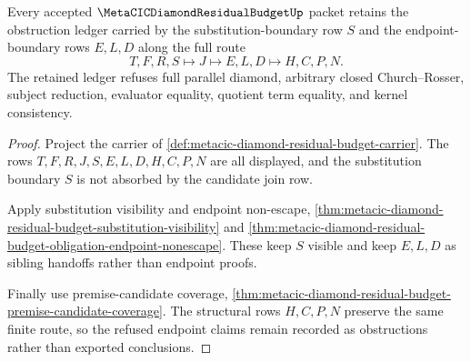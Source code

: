 \begin{theorem}
\label{thm:metacic-diamond-residual-budget-obstruction-ledger}
Every accepted $\MetaCICDiamondResidualBudgetUp$ packet retains the obstruction ledger carried by the substitution-boundary row $S$ and the endpoint-boundary rows $E,L,D$ along the full route
$$
T,F,R,S \longmapsto J \longmapsto E,L,D \longmapsto H,C,P,N .
$$
The retained ledger refuses full parallel diamond, arbitrary closed Church--Rosser, subject reduction, evaluator equality, quotient term equality, and kernel consistency.
\end{theorem}
\begin{proof}
Project the carrier of \autoref{def:metacic-diamond-residual-budget-carrier}. The rows $T,F,R,J,S,E,L,D,H,C,P,N$ are all displayed, and the substitution boundary $S$ is not absorbed by the candidate join row.

Apply substitution visibility and endpoint non-escape, \autoref{thm:metacic-diamond-residual-budget-substitution-visibility} and \autoref{thm:metacic-diamond-residual-budget-obligation-endpoint-nonescape}. These keep $S$ visible and keep $E,L,D$ as sibling handoffs rather than endpoint proofs.

Finally use premise-candidate coverage, \autoref{thm:metacic-diamond-residual-budget-premise-candidate-coverage}. The structural rows $H,C,P,N$ preserve the same finite route, so the refused endpoint claims remain recorded as obstructions rather than exported conclusions.
\end{proof}

